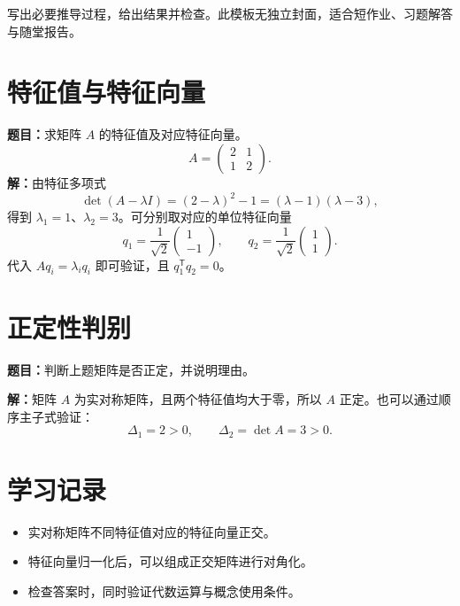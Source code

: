 \documentclass[UTF8,fontset=fandol,a4paper,zihao=5]{ctexart}
\begin{document}
\uestcheading
\begin{summarybox}[作业要求]
写出必要推导过程，给出结果并检查。此模板无独立封面，适合短作业、习题解答与随堂报告。
\end{summarybox}
\section{特征值与特征向量}
\textbf{题目：}求矩阵 $A$ 的特征值及对应特征向量。
\[
A=\begin{pmatrix}2&1\\1&2\end{pmatrix}.
\]
\textbf{解：}由特征多项式
\[
\det(A-\lambda I)=(2-\lambda)^2-1=(\lambda-1)(\lambda-3),
\]
得到 $\lambda_1=1$、$\lambda_2=3$。可分别取对应的单位特征向量
\[
q_1=\frac{1}{\sqrt{2}}\begin{pmatrix}1\\-1\end{pmatrix},\qquad
q_2=\frac{1}{\sqrt{2}}\begin{pmatrix}1\\1\end{pmatrix}.
\]
代入 $Aq_i=\lambda_iq_i$ 即可验证，且 $q_1^{\mathsf T}q_2=0$。
\section{正定性判别}
\textbf{题目：}判断上题矩阵是否正定，并说明理由。

\textbf{解：}矩阵 $A$ 为实对称矩阵，且两个特征值均大于零，所以 $A$ 正定。也可以通过顺序主子式验证：
\[
\Delta_1=2>0,\qquad\Delta_2=\det A=3>0.
\]
\section{学习记录}
\begin{itemize}
\item 实对称矩阵不同特征值对应的特征向量正交。
\item 特征向量归一化后，可以组成正交矩阵进行对角化。
\item 检查答案时，同时验证代数运算与概念使用条件。
\end{itemize}
\end{document}
